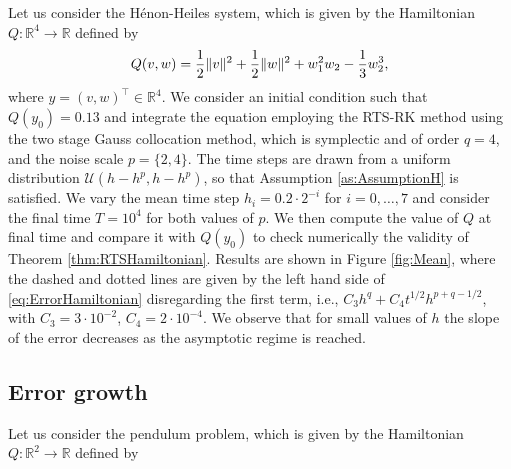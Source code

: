 \documentclass{siamart1116}
\numberwithin{theorem}{section}
\DeclarePairedDelimiter{\norm}{\|}{\|}
\newcommand{\R}{\mathbb{R}}
\begin{document}
Let us consider the Hénon-Heiles system, which is given by the Hamiltonian $Q \colon \R^4 \to \R$ defined by
\begin{equation}\label{eq:HamHH}
	Q(v, w) = \frac{1}{2}\norm{v}^2 + \frac{1}{2}\norm{w}^2 + w_1^2w_2 - \frac{1}{3}w_2^3,
\end{equation}
where $y = (v, w)^\top \in \R^4$. We consider an initial condition such that $Q(y_0) = 0.13$ and integrate the equation employing the RTS-RK method using the two stage Gauss collocation method, which is symplectic and of order $q = 4$, and the noise scale $p = \{2, 4\}$. The time steps are drawn from a uniform distribution $\mathcal{U}(h-h^p, h-h^p)$, so that Assumption \ref{as:AssumptionH} is satisfied. We vary the mean time step $h_i = 0.2 \cdot 2^{-i}$ for $i = 0, \ldots, 7$ and consider the final time $T = 10^4$ for both values of $p$. We then compute the value of $Q$ at final time and compare it with $Q(y_0)$ to check numerically the validity of Theorem \ref{thm:RTSHamiltonian}. Results are shown in Figure \ref{fig:Mean}, where the dashed and dotted lines are given by the left hand side of \eqref{eq:ErrorHamiltonian} disregarding the first term, i.e., $C_3h^q + C_4t^{1/2}h^{p+q-1/2}$, with $C_3 = 3\cdot 10^{-2}$, $C_4 = 2\cdot 10^{-4}$. We observe that for small values of $h$ the slope of the error decreases as the asymptotic regime is reached.

\subsection{Error growth} Let us consider the pendulum problem, which is given by the Hamiltonian $Q \colon \R^2 \to \R$ defined by
\end{document}
